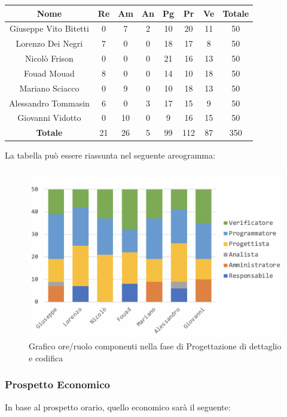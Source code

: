 		\begin{longtable}{|c|c|c|c|c|c|c|c}
			\hline
			\rowcolor{lighter-grayer}
			\textbf{Nome} & \textbf{Re} & \textbf{Am} & \textbf{An} & \textbf{Pg}  & \textbf{Pr}   & \textbf{Ve} & \textbf{Totale} \\
			\hline
			\endfirsthead
			
			\hline
			Giuseppe Vito Bitetti 		& 0 & 7 & 2 & 10 & 20 & 11 & 50\\
			\hline
			\hline
			Lorenzo Dei Negri			& 7 & 0 & 0 & 18 & 17 & 8 & 50\\
			\hline
			\hline
			Nicolò Frison				    & 0 & 0 & 0 & 21 & 16 & 13 & 50\\
			\hline
			\hline
			Fouad Mouad 				 & 8 & 0 & 0 & 14 & 10 & 18 & 50\\
			\hline
			\hline
			Mariano Sciacco 			& 0 & 9 & 0 & 10 & 18 & 13 & 50\\
			\hline
			\hline
			Alessandro Tommasin    & 6 & 0 & 3 & 17 & 15 & 9 & 50\\
			\hline
			\hline
			Giovanni Vidotto 			 & 0 & 10 & 0 & 9 & 16 & 15 & 50\\
			\hline 
			\textbf{Totale}			 & 21 &  26 & 5 & 99 & 112 & 87 & 350\\
			\hline
		\end{longtable}
		\pagebreak
		
		La tabella può essere riassunta nel seguente areogramma:
		\begin{figure}[H]
			\centering
			\includegraphics[width=0.8\linewidth]{./images/progDetCod1.png}
			\caption{Grafico ore/ruolo componenti nella fase di Progettazione di dettaglio e codifica}
			\label{fig:grafico suddivione ruoli fase Progettazione dettaglio  e codifica}
		\end{figure}
	
		\subsubsection{Prospetto Economico}
		In base al prospetto orario, quello economico sarà il seguente: 
		
